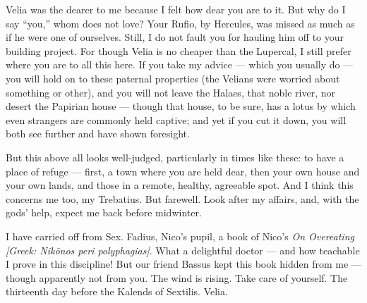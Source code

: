 

 Velia was the dearer to me because I felt how dear you are to it. But why do I say ``you,'' whom does not love? Your Rufio, by Hercules, was missed as much as if he were one of ourselves. Still, I do not fault you for hauling him off to your building project. For though Velia is no cheaper than the Lupercal, I still prefer where you are to all this here. If you take my advice --- which you usually do --- you will hold on to these paternal properties (the Velians were worried about something or other), and you will not leave the Halaes, that noble river, nor desert the Papirian house --- though that house, to be sure, has a lotus by which even strangers are commonly held captive; and yet if you cut it down, you will both see further and have shown foresight.

 But this above all looks well-judged, particularly in times like these: to have a place of refuge --- first, a town where you are held dear, then your own house and your own lands, and those in a remote, healthy, agreeable spot. And I think this concerns me too, my Trebatius. But farewell. Look after my affairs, and, with the gods' help, expect me back before midwinter.

 I have carried off from Sex. Fadius, Nico's pupil, a book of Nico's \textit{On Overeating} \textit{[Greek: Nikōnos peri polyphagias]}. What a delightful doctor --- and how teachable I prove in this discipline! But our friend Bassus kept this book hidden from me --- though apparently not from you. The wind is rising. Take care of yourself. The thirteenth day before the Kalends of Sextilis. Velia.
